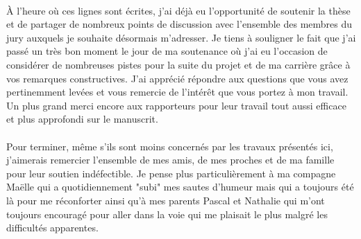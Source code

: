 \paragraph*{}
\`A l'heure où ces lignes sont écrites, j'ai déjà eu l'opportunité de soutenir la thèse et de partager de nombreux points de discussion avec l'ensemble des membres du jury auxquels je souhaite désormais m'adresser. Je tiens à souligner le fait que j'ai passé un très bon moment le jour de ma soutenance où j'ai eu l'occasion de considérer de nombreuses pistes pour la suite du projet et de ma carrière grâce à vos remarques constructives. J'ai apprécié répondre aux questions que vous avez pertinemment levées et vous remercie de l'intérêt que vous portez à mon travail. Un plus grand merci encore aux rapporteurs pour leur travail tout aussi efficace et plus approfondi sur le manuscrit.

\paragraph*{}
Pour terminer, même s'ils sont moins concernés par les travaux présentés ici, j'aimerais remercier l'ensemble de mes amis, de mes proches et de ma famille pour leur soutien indéfectible. Je pense plus particulièrement à ma compagne Maëlle qui a quotidiennement "subi" mes sautes d'humeur mais qui a toujours été là pour me réconforter ainsi qu'à mes parents Pascal et Nathalie qui m'ont toujours encouragé pour aller dans la voie qui me plaisait le plus malgré les difficultés apparentes.